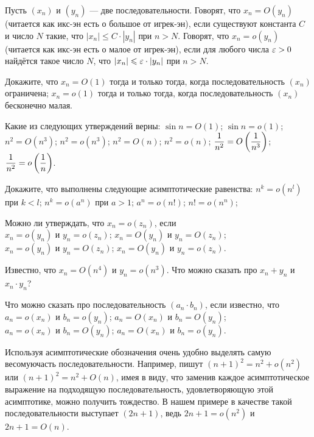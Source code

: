 \documentclass[a4paper,12pt]{article}
\begin{document}

Пусть $(x_n)$ и $(y_n)$ --- две последовательности.
Говорят, что $x_n = O(y_n)$ (читается как  икс-эн есть о большое от игрек-эн), 
если существуют константа $C$ и число $N$ такие, что $|x_n|\le C\cdot|y_n|$ при $n>N$.
Говорят, что $x_n = o(y_n)$ (читается как  икс-эн есть о малое от игрек-эн),
если для любого числа $\varepsilon>0$ найдётся такое число $N$, что $|x_n|\leqslant \varepsilon\cdot|y_n|$ при $n>N$.

Докажите, что 
$x_n = O(1)$ тогда и только тогда, когда последовательность $(x_n)$ ограничена;
$x_n = o(1)$ тогда и только тогда, когда последовательность $(x_n)$ бесконечно малая.

Какие из следующих утверждений верны:
$\sin n = O(1)$;
$\sin n = o(1)$;
\smallskip%
\\
$n^2 = O(n^3)$;
$n^2 = o(n^3)$;
$n^2 = O(n)$;
$n^2 = o(n)$;
$\dfrac{1}{n^2} = O\left(\dfrac{1}{n^3}\right)$;
$\dfrac{1}{n^2} = o\left(\dfrac{1}{n}\right)$.

Докажите, что выполнены следующие асимптотические равенства:
$n^k = o(n^l)$ при $k < l$;
$n^k = o(a^n)$ при $a > 1$;
$a^n = o(n!)$;
$n! = o(n^n)$;

Можно ли утверждать, что $x_n = o(z_n)$, если
\\
$x_n = o(y_n)$ и $y_n = o(z_n)$;
$x_n = O(y_n)$ и $y_n = O(z_n)$;
\\
$x_n = o(y_n)$ и $y_n = O(z_n)$;
$x_n = O(y_n)$ и $y_n = o(z_n)$.

Известно, что $x_n=O(n^4)$ и $y_n = o(n^3)$.
Что можно сказать про $x_n + y_n$ и $x_n \cdot y_n$?

Что можно сказать про последовательность $(a_n\cdot b_n)$, если известно, что
\\
$a_n = o(x_n)$ и $b_n = o(y_n)$;
$a_n = O(x_n)$ и $b_n = O(y_n)$;
\\
$a_n = o(x_n)$ и $b_n = O(y_n)$;
$a_n = O(x_n)$ и $b_n = o(y_n)$.

Используя асимптотические обозначения очень удобно выделять самую  весомую часть последовательности.
Например, пишут $(n+1)^2 = n^2 + o(n^2)$ или $(n+1)^2 = n^2 + O(n)$, имея в виду, что заменив каждое асимптотическое выражение на подходящую последовательность, удовлетворяющую этой асимптотике, можно получить тождество.
В нашем примере в качестве такой последовательности выступает $(2n+1)$, ведь $2n+1 = o(n^2)$ и $2n+1 = O(n)$.
\end{document}
